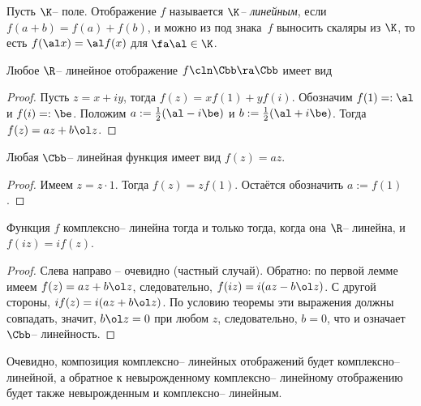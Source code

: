 \documentclass[a4paper]{article}
\begin{document}
\begin{df}
Пусть $\K$-- поле. Отображение $f$ называется \emph{$\K$-- линейным}, если $f(a+b)=f(a)+f(b)$, и можно из под знака~$f$
выносить скаляры из $\K$, то есть $f(\al x)=\al f(x)$ для $\fa \al \in \K$.
\end{df}

\begin{lemma}
Любое $\R$-- линейное отображение $f\cln\Cbb\ra\Cbb$ имеет вид
\end{lemma}
\begin{proof}
Пусть $z=x+iy$, тогда $f(z)=xf(1)+yf(i)$. Обозначим $f(1) =: \al$ и $f(i) =: \be$. Положим $a := \frac12(\al-i\be)$ и
$b := \frac12(\al+i\be)$. Тогда $f(z) = az+b\ol z$.
\end{proof}

\begin{lemma}
Любая $\Cbb$-- линейная функция имеет вид $f(z)=az$.
\end{lemma}
\begin{proof}
Имеем $z = z \cdot 1$. Тогда $f(z)=zf(1)$. Остаётся обозначить $a := f(1)$.
\end{proof}

\begin{theorem}
Функция $f$ комплексно-- линейна тогда и только тогда, когда она $\R$-- линейна, и $f(iz)=if(z)$.
\end{theorem}
\begin{proof}
Слева направо -- очевидно (частный случай). Обратно: по первой лемме имеем $f(z)=az+b\ol z$, следовательно,
$f(iz)=i(az-b\ol z)$. С другой стороны, $i f(z)=i(az+b\ol z)$.
По условию теоремы эти выражения должны совпадать, значит, $b\ol z = 0$ при любом $z$, следовательно, $b=0$, что и
означает $\Cbb$-- линейность.
\end{proof}

Очевидно, композиция комплексно-- линейных отображений будет комплексно-- линейной, а обратное к невырожденному
комплексно-- линейному отображению будет также невырожденным и комплексно-- линейным.
\end{document}
